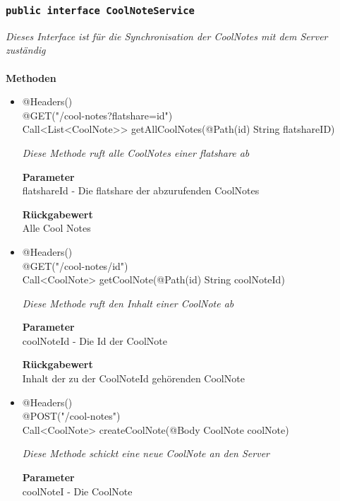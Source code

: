 \documentclass[a4paper]{scrreprt}
\begin{document}
             
             	\subsubsection{\texttt{public interface CoolNoteService }}
        \textit{Dieses Interface ist für die Synchronisation der CoolNotes mit dem Server zuständig}\\
        \\
		\textbf{Methoden} \\
 			\begin{itemize}
        		\item{@Headers()\\@GET("/cool-notes?flatshare={id}")\\ Call<List<CoolNote>> getAllCoolNotes(@Path(\grqq id\grqq) String flatshareID)} 
        	
        		\textit{Diese Methode ruft alle CoolNotes einer flatshare ab}
        	
        		\textbf{Parameter} \\
                flatshareId - Die flatshare der abzurufenden CoolNotes
        		        	
       		 	\textbf{Rückgabewert} \\
                Alle Cool Notes
      		  	 
      	      \item{@Headers() \\ @GET("/cool-notes/{id}")\\ Call<CoolNote> getCoolNote(@Path(\grqq id\grqq) String coolNoteId)}
        	
      	 	 	\textit{Diese Methode ruft den Inhalt einer CoolNote ab }
        	
        		\textbf{Parameter} \\
        		coolNoteId - Die Id der CoolNote 
        	
        		\textbf{Rückgabewert} \\
                Inhalt der zu der CoolNoteId gehörenden CoolNote
        	
              \item{@Headers() \\ @POST("/cool-notes")\\ Call<CoolNote> createCoolNote(@Body CoolNote coolNote)}
        	
      	 	 	\textit{Diese Methode schickt eine neue CoolNote an den Server }
        	
        		\textbf{Parameter} \\
        		coolNoteI - Die CoolNote 
        	

\end{itemize}
\end{document}
